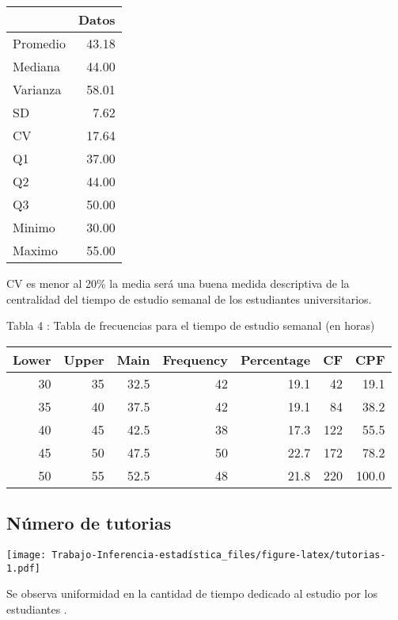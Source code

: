 \documentclass[
  man]{apa6}
\begin{document}
\begin{center}

\begin{tabular}{l|r}
\hline
  & Datos\\
\hline
Promedio & 43.18\\
\hline
Mediana & 44.00\\
\hline
Varianza & 58.01\\
\hline
SD & 7.62\\
\hline
CV & 17.64\\
\hline
Q1 & 37.00\\
\hline
Q2 & 44.00\\
\hline
Q3 & 50.00\\
\hline
Minimo & 30.00\\
\hline
Maximo & 55.00\\
\hline
\end{tabular}
\end{center}

CV es menor al 20\% la media será una buena medida descriptiva de la
centralidad del tiempo de estudio semanal de los estudiantes
universitarios.

Tabla 4 : Tabla de frecuencias para el tiempo de estudio semanal (en
horas)

\begin{center}


\begin{tabular}{r|r|r|r|r|r|r}
\hline
Lower & Upper & Main & Frequency & Percentage & CF & CPF\\
\hline
30 & 35 & 32.5 & 42 & 19.1 & 42 & 19.1\\
\hline
35 & 40 & 37.5 & 42 & 19.1 & 84 & 38.2\\
\hline
40 & 45 & 42.5 & 38 & 17.3 & 122 & 55.5\\
\hline
45 & 50 & 47.5 & 50 & 22.7 & 172 & 78.2\\
\hline
50 & 55 & 52.5 & 48 & 21.8 & 220 & 100.0\\
\hline
\end{tabular}
\end{center}

\hypertarget{nuxfamero-de-tutorias}{%
\subsection{Número de tutorias}\label{nuxfamero-de-tutorias}}

\texttt{[image: Trabajo-Inferencia-estadística\_files/figure-latex/tutorias-1.pdf]}

Se observa uniformidad en la cantidad de tiempo dedicado al estudio por
los estudiantes .
\end{document}
